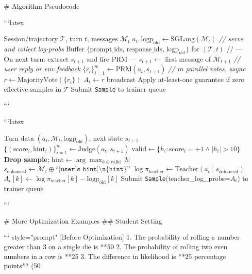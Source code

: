 # Algorithm Pseudocode


```latex
\begin{algorithm}[h]
\caption{Binary RL Pipeline (per main-line turn, both tracks)}
\label{alg:binary_rl}
\begin{algorithmic}[1]
\REQUIRE Session/trajectory $\mathcal{T}$, turn $t$, messages $\mathcal{M}_t$
\STATE $a_t, \text{logp}_{\text{old}} \leftarrow \text{SGLang}(\mathcal{M}_t)$ \hfill \textit{// serve and collect log-probs}
\STATE Buffer $\{\text{prompt\_ids},\, \text{response\_ids},\, \text{logp}_{\text{old}}\}$ for $(\mathcal{T}, t)$
\STATE // --- On next turn: extract $s_{t+1}$ and fire PRM ---
\STATE $s_{t+1} \leftarrow$ first message of $\mathcal{M}_{t+1}$ \hfill \textit{// user reply or env feedback}
\STATE $\{r_i\}_{i=1}^m \leftarrow \text{PRM}(a_t, s_{t+1})$ \hfill \textit{// $m$ parallel votes, async}
\STATE $r \leftarrow \text{MajorityVote}(\{r_i\})$
\STATE $A_t \leftarrow r$ broadcast
\STATE Apply at-least-one guarantee if zero effective samples in $\mathcal{T}$
\STATE Submit \texttt{Sample} to trainer queue
\end{algorithmic}
\end{algorithm}
```


```latex
\begin{algorithm}[h]
\caption{OPD Pipeline (personal agent track)}
\label{alg:opd}
\begin{algorithmic}[1]
\REQUIRE Turn data $(a_t, \mathcal{M}_t, \text{logp}_{\text{old}})$, next state $s_{t+1}$
\STATE $\{(\text{score}_i, \text{hint}_i)\}_{i=1}^m \leftarrow \text{Judge}(a_t, s_{t+1})$
\STATE $\text{valid} \leftarrow \{h_i : \text{score}_i = +1 \wedge |h_i| > 10\}$
 \STATE \textbf{Drop sample}; \RETURN \ENDIF
\STATE $\text{hint} \leftarrow \arg\max_{h \in \text{valid}} |h|$
\STATE $s_{\text{enhanced}} \leftarrow \mathcal{M}_t \oplus \texttt{``[user's hint]\textbackslash n\{hint\}''}$
\STATE $\log\pi_{\text{teacher}} \leftarrow \text{Teacher}(a_t \mid s_{\text{enhanced}})$
\STATE $A_t[k] \leftarrow \log\pi_{\text{teacher}}[k] - \text{logp}_{\text{old}}[k]$
\STATE Submit \texttt{Sample}(teacher\_log\_probs=$A_t$) to trainer queue
\end{algorithmic}
\end{algorithm}
```


# More Optimization Examples
## Student Setting


``` {style="prompt"}
[Before Optimization]
1. The probability of rolling a number greater than 3 on a single die is **50%
2. The probability of rolling two even numbers in a row is **25%
3. The difference in likelihood is **25 percentage points** (50%

